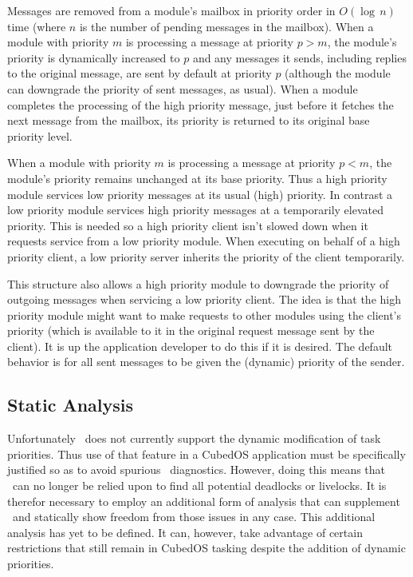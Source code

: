 Messages are removed from a module's mailbox in priority order in $O(\log\,n)$ time (where $n$
is the number of pending messages in the mailbox).  When a module with priority $m$ is processing a message at priority $p > m$, the
module's priority is dynamically increased to $p$ and any messages it sends, including replies
to the original message, are sent by default at priority $p$ (although the module can downgrade
the priority of sent messages, as usual). When a module completes the processing of the high
priority message, just before it fetches the next message from the mailbox, its priority is
returned to its original base priority level.

When a module with priority $m$ is processing a message at priority $p < m$, the module's
priority remains unchanged at its base priority. Thus a high priority module services low
priority messages at its usual (high) priority. In contrast a low priority module services high
priority messages at a temporarily elevated priority. This  is
needed so a high priority client isn't slowed down when it requests service from a low priority
module. When executing on behalf of a high priority client, a low priority server inherits the
priority of the client temporarily.

This structure also allows a high priority module to downgrade the priority of outgoing messages
when servicing a low priority client. The idea is that the high priority module might want to
make requests to other modules using the client's priority (which is available to it in the
original request message sent by the client). It is up the application developer to do this if
it is desired. The default behavior is for all sent messages to be given the (dynamic) priority
of the sender.

\subsection{Static Analysis}

Unfortunately \SPARK\ does not currently support the dynamic modification of task priorities.
Thus use of that feature in a CubedOS application must be specifically justified so as to avoid
spurious \SPARK\ diagnostics. However, doing this means that \SPARK\ can no longer be relied
upon to find all potential deadlocks or livelocks. It is therefor necessary to employ an
additional form of analysis that can supplement \SPARK\ and statically show freedom from those
issues in any case. This additional analysis has yet to be defined. It can, however, take
advantage of certain restrictions that still remain in CubedOS tasking despite the addition of
dynamic priorities.

